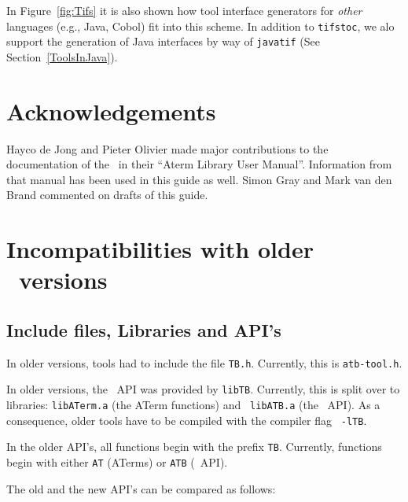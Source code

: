 \documentclass[twoside]{article} %
\begin{document}
%

In Figure~\ref{fig:Tifs} it is also shown how tool interface generators for
{\em other} languages (e.g., Java, Cobol) fit into this scheme.  In addition
to {\tt tifstoc}, we alo support the generation of Java interfaces by way of
{\tt javatif} (See Section~\ref{ToolsInJava}).



\section*{Acknowledgements}
Hayco de Jong and Pieter Olivier made major contributions to the
documentation of the \TB\ in their ``Aterm Library User Manual''.
Information from that manual has been used in this guide as well.
Simon Gray and Mark van den Brand commented on drafts of this guide.

\appendix


\newpage
\section{Incompatibilities with older \TB\ versions}

\subsection{Include files, Libraries and API's}

In older versions, tools had to include the file {\tt TB.h}.
Currently, this is {\tt atb-tool.h}.

In older versions, the \TB\ API was provided by {\tt libTB}.  Currently, this
is split over to libraries: {\tt libATerm.a} (the ATerm functions) and {\tt
  libATB.a} (the \TB\ API).
As a consequence, older tools have to be compiled with the compiler flag {\tt
  -lTB}.

In the older API's, all functions begin with the prefix {\tt TB}.  Currently,
functions begin with either {\tt AT} (ATerms) or {\tt ATB} (\TB\ API).

The old and the new API's can be compared as follows:
\end{document}
